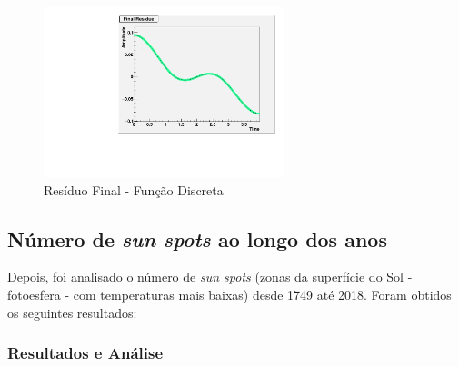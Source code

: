 \documentclass[letterpaper]{article}
\begin{document}
\begin{multicols}{2}
\begin{center}
\begin{figure}[H]
\centering
    \includegraphics[width=7cm]{Residue_Sen.pdf}
    \caption{Resíduo Final - Função Discreta}
\end{figure}
\end{center}

\end{multicols}

\begin{multicols}{2}

\subsection{Número de \textit{sun spots} ao longo dos anos}

\par Depois, foi analisado o número de \textit{sun spots} (zonas da superfície do Sol - fotoesfera - com temperaturas mais baixas) desde 1749 até 2018. Foram obtidos os seguintes resultados:

\end{multicols}


\subsubsection{Resultados e Análise}
\end{document}
